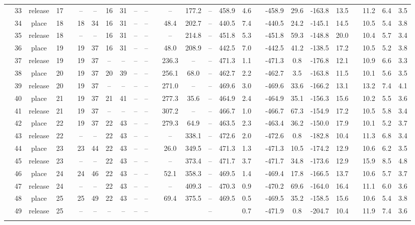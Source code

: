 \begin{landscape}
\begin{table}[h!]
\begin{threeparttable}
\begin{tabular}{c cccr ccccccr cccccr ccccr ccc}
				&33 &release &17 &&-- &-- &16 &31 &-- &-- &&-- &177.2 &-- &458.9 &4.6 &&-458.9 &29.6 &-163.8 &13.5 &&11.2 &6.4 &3.5 \\
				&34 &place &18 &&18 &34 &16 &31 &-- &-- &&48.4 &202.7 &-- &440.5 &7.4 &&-440.5 &24.2 &-145.1 &14.5 &&10.5 &5.4 &3.8 \\
				&35 &release &18 &&-- &-- &16 &31 &-- &-- &&-- &214.8 &-- &451.8 &5.3 &&-451.8 &59.3 &-148.8 &20.0 &&10.4 &5.7 &3.4 \\
				&36 &place &19 &&19 &37 &16 &31 &-- &-- &&48.0 &208.9 &-- &442.5 &7.0 &&-442.5 &41.2 &-138.5 &17.2 &&10.5 &5.2 &3.8 \\
				\rowcolor{lightgray} &37 &release &19 &&19 &37 &-- &-- &-- &-- &&236.3 &-- &-- &471.3 &1.1 &&-471.3 &0.8 &-176.8 &12.1 &&10.9 &6.6 &3.3 \\
				\rowcolor{lightgray} &38 &place &20 &&19 &37 &20 &39 &-- &-- &&256.1 &68.0 &-- &462.7 &2.2 &&-462.7 &3.5 &-163.8 &11.5 &&10.1 &5.6 &3.5 \\
				&39 &release &20 &&19 &37 &-- &-- &-- &-- &&271.0 &-- &-- &469.6 &3.0 &&-469.6 &33.6 &-166.2 &13.1 &&13.2 &7.4 &4.1 \\
				&40 &place &21 &&19 &37 &21 &41 &-- &-- &&277.3 &35.6 &-- &464.9 &2.4 &&-464.9 &35.1 &-156.3 &15.6 &&10.2 &5.5 &3.6 \\
				&41 &release &21 &&19 &37 &-- &-- &-- &-- &&307.2 &-- &-- &466.7 &1.0 &&-466.7 &67.3 &-154.9 &17.2 &&10.5 &5.8 &3.4 \\
				&42 &place &22 &&19 &37 &22 &43 &-- &-- &&279.3 &64.9 &-- &463.5 &2.3 &&-463.4 &36.2 &-150.0 &17.9 &&10.1 &5.2 &3.7 \\
				\rowcolor{lightgray} &43 &release &22 &&-- &-- &22 &43 &-- &-- &&-- &338.1 &-- &472.6 &2.0 &&-472.6 &0.8 &-182.8 &10.4 &&11.3 &6.8 &3.4 \\
				\rowcolor{lightgray} &44 &place &23 &&23 &44 &22 &43 &-- &-- &&26.0 &349.5 &-- &471.3 &1.3 &&-471.3 &10.5 &-174.2 &12.9 &&10.6 &6.2 &3.5 \\
				&45 &release &23 &&-- &-- &22 &43 &-- &-- &&-- &373.4 &-- &471.7 &3.7 &&-471.7 &34.8 &-173.6 &12.9 &&15.9 &8.5 &4.8 \\
				&46 &place &24 &&24 &46 &22 &43 &-- &-- &&52.1 &358.3 &-- &469.5 &1.4 &&-469.4 &17.8 &-166.5 &13.7 &&10.6 &5.7 &3.7 \\
				&47 &release &24 &&-- &-- &22 &43 &-- &-- &&-- &409.3 &-- &470.3 &0.9 &&-470.2 &69.6 &-164.0 &16.4 &&11.1 &6.0 &3.6 \\
				&48 &place &25 &&25 &49 &22 &43 &-- &-- &&69.4 &375.5 &-- &469.5 &0.5 &&-469.5 &35.2 &-158.5 &15.6 &&10.6 &5.4 &3.8 \\
				\rowcolor{lightgray} &49 &release &25 &&-- &-- &-- &-- &-- &-- && & &-- & &0.7 &&-471.9 &0.8 &-204.7 &10.4 &&11.9 &7.4 &3.6 \\
				\specialrule{0.10em}{0.2em}{.2em}
			\end{tabular}
			

\end{threeparttable}
\end{table}
\end{landscape}
